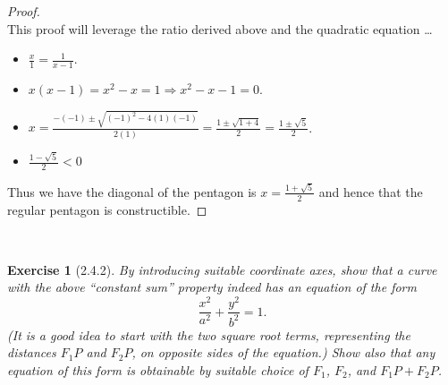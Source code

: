 \documentclass[12pt]{article}
\newcommand{\XB}{\color{black}}
\newcommand{\XBB}{\color{blue}}
\newcommand{\ds}{\displaystyle}
\theoremstyle{plain}
\newtheorem{ex}{Exercise}
\begin{document}
\begin{proof}
  \ \\

  This proof will leverage the ratio derived above and the quadratic equation \dots
  \begin{itemize}
    \item $ \ds \frac{x}{1} = \frac{1}{x-1} $.
    \item $ \ds x(x-1) = x^{2} - x = 1 \Rightarrow x^{2} - x - 1 = 0 $.
    \item $ \ds x = \frac{-(-1) \pm \sqrt{(-1)^{2} - 4(1)(-1)}}{2(1)} = \frac{1 \pm \sqrt{1 + 4}}{2} = \frac{1 \pm \sqrt{5}}{2} $.
    \item $ \ds \frac{1 - \sqrt{5}}{2} < 0 $
  \end{itemize}

  Thus we have the diagonal of the pentagon is $ \ds x = \frac{1 + \sqrt{5}}{2} $ and hence that the regular pentagon is constructible.
\end{proof}

\newpage
\XBB\hrulefill\XB \\
\begin{ex} [2.4.2]
  By introducing suitable coordinate axes, show that a curve with the above ``constant sum'' property indeed has an equation of the form
  \[
    \frac{x^2}{a^2}+\frac{y^2}{b^2}=1.
  \]
  (It is a good idea to start with the two square root terms, representing the distances $F_1P$ and $F_2P$, on opposite sides of the equation.) Show also that any equation of this form is obtainable by suitable choice of $F_1$, $F_2$, and $F_1P+F_2P$.
\end{ex}
\XBB\hrulefill\XB \\
\end{document}
